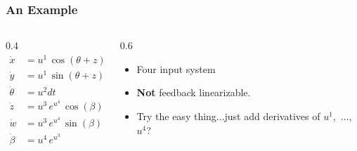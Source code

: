 \documentclass[a4paper]{beamer}
\begin{document}
\begin{frame}
  \frametitle{An Example}
  \begin{columns}
    \begin{column}{0.4\textwidth}
      \[
        \begin{aligned}
          \dot{x} &= u^1\,\cos(\theta + z)\\
          \dot{y} &= u^1\,\sin(\theta + z)\\
          \dot{\theta} &= u^2 dt\\
          \dot{z} &= u^3\, e^{u^4}\, \cos(\beta)\\
          \dot{w} &= u^3\, e^{u^4}\, \sin(\beta)\\
          \dot{\beta} &= u^4\, e^{u^3}
        \end{aligned}
      \]
    \end{column}
    \begin{column}{0.6\textwidth}
      \begin{itemize}
        \item{Four input system}
        \item{\textbf{Not} feedback linearizable.}
        \item{Try the easy thing...just add derivatives of \(u^1,\) \(\ldots,\) \(u^4\)?}
      \end{itemize}
    \end{column}
  \end{columns}
\end{frame}
\end{document}
